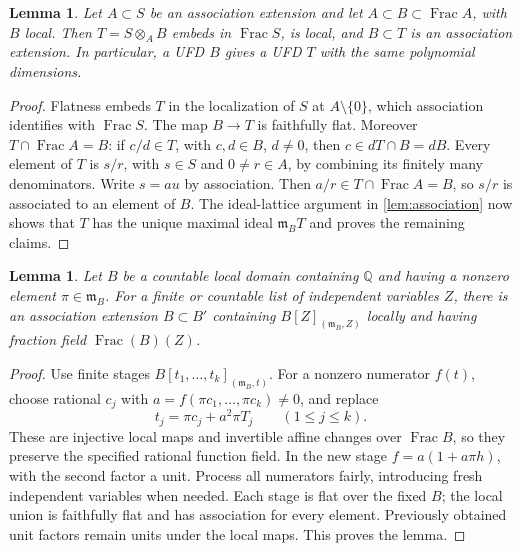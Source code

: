 \documentclass[11pt,reqno]{amsart}
\numberwithin{equation}{section}
\theoremstyle{plain}
\newtheorem{lemma}[theorem]{Lemma}
\theoremstyle{definition}
\theoremstyle{remark}
\begin{document}
\begin{lemma}\label{lem:birational-association}
Let \(A\subset S\) be an association extension and let
\(A\subset B\subset\operatorname{Frac}A\), with \(B\)
local. Then \(T=S\otimes_A B\) embeds in
\(\operatorname{Frac}S\), is local, and \(B\subset T\) is
an association extension. In particular, a UFD \(B\) gives
a UFD \(T\) with the same polynomial dimensions.
\end{lemma}
\begin{proof}
Flatness embeds \(T\) in the localization of \(S\) at
\(A\setminus\{0\}\), which association identifies with
\(\operatorname{Frac}S\). The map \(B\to T\) is faithfully
flat. Moreover \(T\cap\operatorname{Frac}A=B\): if
\(c/d\in T\), with \(c,d\in B\), \(d\ne0\), then
\(c\in dT\cap B=dB\). Every element of \(T\) is \(s/r\),
with \(s\in S\) and \(0\ne r\in A\), by combining its
finitely many denominators. Write \(s=au\) by association.
Then \(a/r\in T\cap\operatorname{Frac}A=B\), so \(s/r\)
is associated to an element of \(B\). The ideal-lattice argument
in \cref{lem:association} now shows that \(T\) has the unique
maximal ideal \(\mathfrak m_BT\) and proves the remaining claims.
\end{proof}

\begin{lemma}\label{lem:rational-padding}
Let \(B\) be a countable local domain containing \(\mathbb Q\)
and having a nonzero element \(\pi\in\mathfrak m_B\).
For a finite or countable list of independent variables \(Z\),
there is an association extension \(B\subset B'\) containing
\(B[Z]_{(\mathfrak m_B,Z)}\) locally and having fraction field
\(\operatorname{Frac}(B)(Z)\).
\end{lemma}
\begin{proof}
Use finite stages \(B[t_1,\ldots,t_k]_{(\mathfrak m_B,t)}\).
For a nonzero numerator \(f(t)\), choose rational \(c_j\)
with \(a=f(\pi c_1,\ldots,\pi c_k)\ne0\), and replace
\[
 t_j=\pi c_j+a^2\pi T_j\qquad(1\le j\le k).
\]
These are injective local maps and invertible affine changes
over \(\operatorname{Frac}B\), so they preserve the specified
rational function field. In the new stage
\(f=a(1+a\pi h)\), with the second factor a unit.
Process all numerators fairly, introducing fresh independent
variables when needed. Each stage is flat over the fixed \(B\);
the local union is faithfully flat and has association for every
element. Previously obtained unit factors remain units under
the local maps. This proves the lemma.
\end{proof}
\end{document}
